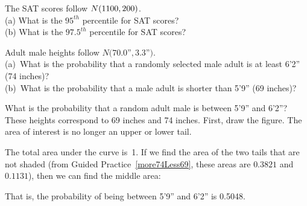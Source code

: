 \begin{exercisewrap}
\begin{nexercise}
The SAT scores follow $N(1100{}, 200{})$.\footnotemark{} \\
(a) What is the $95^{th}$ percentile for SAT scores? \\
(b) What is the $97.5^{th}$ percentile for SAT scores?
\end{nexercise}
\end{exercisewrap}

\begin{exercisewrap}
\begin{nexercise}\label{more74Less69}
Adult male heights follow $N(70.0$''$, 3.3$''$)$.\footnotemark{} \\
(a)~What is the probability that a randomly selected male
    adult is at least 6'2'' (74 inches)? \\
(b)~What is the probability that a male adult is shorter
    than 5'9'' (69 inches)?
\end{nexercise}
\end{exercisewrap}

\begin{examplewrap}
\begin{nexample}{What is the probability that a random adult
    male is between 5'9'' and 6'2''?}
  These heights correspond to 69 inches and 74 inches.
  First, draw the figure.
  The area of interest is no longer an upper or lower
  tail.\vspace{-2mm}
  \begin{center}
  \vspace{-2mm}
  \end{center}
  The total area under the curve is~1.
  If we find the area of the two tails that are not shaded
  (from Guided Practice~\ref{more74Less69}, these areas are
  $0.3821$ and $0.1131$), then we can find the middle
  area:\vspace{-2mm}
  \begin{center}
  \vspace{-2mm}
  \end{center}
  That is, the probability of being between 5'9'' and 6'2''
  is 0.5048.
\end{nexample}
\end{examplewrap}


